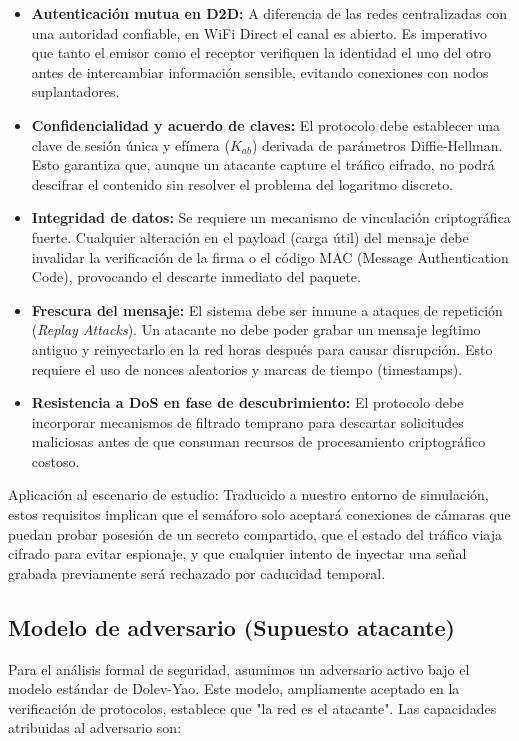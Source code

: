 \documentclass[conference,a4paper,onecolumn,11pt]{IEEEtran} %
\begin{document}
\begin{itemize}
    \item \textbf{Autenticación mutua en D2D:} 
    A diferencia de las redes centralizadas con una autoridad confiable, en WiFi Direct el canal es abierto. Es imperativo que tanto el emisor como el receptor verifiquen la identidad el uno del otro antes de intercambiar información sensible, evitando conexiones con nodos suplantadores.

    \item \textbf{Confidencialidad y acuerdo de claves:} 
    El protocolo debe establecer una clave de sesión única y efímera ($K_{ab}$) derivada de parámetros Diffie-Hellman. Esto garantiza que, aunque un atacante capture el tráfico cifrado, no podrá descifrar el contenido sin resolver el problema del logaritmo discreto.
    
    \item \textbf{Integridad de datos:} 
    Se requiere un mecanismo de vinculación criptográfica fuerte. Cualquier alteración en el payload (carga útil) del mensaje debe invalidar la verificación de la firma o el código MAC (Message Authentication Code), provocando el descarte inmediato del paquete.
    
    \item \textbf{Frescura del mensaje:} 
    El sistema debe ser inmune a ataques de repetición (\textit{Replay Attacks}). Un atacante no debe poder grabar un mensaje legítimo antiguo y reinyectarlo en la red horas después para causar disrupción. Esto requiere el uso de nonces aleatorios y marcas de tiempo (timestamps).
    
    \item \textbf{Resistencia a DoS en fase de descubrimiento:} 
    El protocolo debe incorporar mecanismos de filtrado temprano para descartar solicitudes maliciosas antes de que consuman recursos de procesamiento criptográfico costoso.
\end{itemize}

\text Aplicación al escenario de estudio:
Traducido a nuestro entorno de simulación, estos requisitos implican que el semáforo solo aceptará conexiones de cámaras que puedan probar posesión de un secreto compartido, que el estado del tráfico viaja cifrado para evitar espionaje, y que cualquier intento de inyectar una señal grabada previamente será rechazado por caducidad temporal.

\subsection{Modelo de adversario (Supuesto atacante)}
Para el análisis formal de seguridad, asumimos un adversario activo bajo el modelo estándar de Dolev-Yao. Este modelo, ampliamente aceptado en la verificación de protocolos, establece que "la red es el atacante". Las capacidades atribuidas al adversario son:
\end{document}
